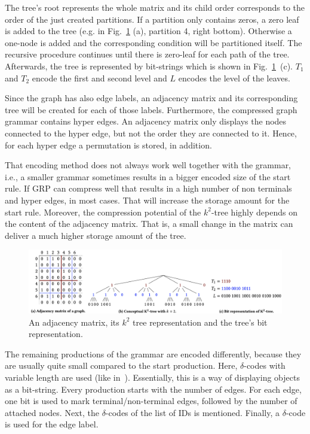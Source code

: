 The tree's root represents the whole matrix and its child order corresponds to the order of the just created partitions. If a partition only contains zeros, a zero leaf is added to the tree (e.g. in Fig.~\ref{fig:encoding} (a), partition 4, right bottom). Otherwise a one-node is added and the corresponding condition will be partitioned itself. The recursive procedure continues until there is zero-leaf for each path of the tree. Afterwards, the tree is represented by bit-strings which is shown in Fig.~\ref{fig:encoding}~(c). $T_1$ and $T_2$ encode the first and second level and $L$ encodes the level of the leaves. 

Since the graph has also edge labels, an adjacency matrix and its corresponding tree will be created for each of those labels. Furthermore, the compressed graph grammar contains hyper edges. An adjacency matrix only displays the nodes connected to the hyper edge, but not the order they are connected to it. Hence, for each hyper edge a permutation is stored, in addition.

That encoding method does not always work well together with the grammar, i.e., a smaller grammar sometimes results in a bigger encoded size of the start rule. If GRP can compress well that results in a high number of non terminals and hyper edges, in most cases. That will increase the storage amount for the start rule. Moreover, the compression potential of the $k^2$-tree highly depends on the content of the adjacency matrix. That is, a small change in the matrix can deliver a much higher storage amount of the tree.


\begin{figure}
	\centering
	\includegraphics[width=1\linewidth]{figures/relatedwork/encoding}
	\caption{An adjacency matrix, its $k^2$ tree representation and the tree's bit representation.}
	\label{fig:encoding}
\end{figure}

The remaining productions of the grammar are encoded differently, because they are usually quite small compared to the start production. Here, $\delta $-codes with variable length are used (like in~\cite{codes}). Essentially, this is a way of displaying objects as a bit-string. Every production starts with the number of edges. For each edge, one bit is used to mark terminal/non-terminal edges, followed by the number of attached nodes. Next, the $\delta$-codes of the list of IDs is mentioned. Finally, a $\delta$-code is used for the edge label.~\cite{maneth}


